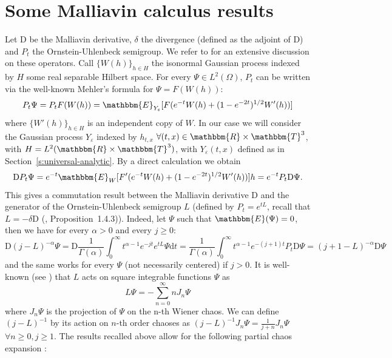 \documentclass[a4paper,11pt]{article}
\newcommand{\mathD}{\mathrm{D}}
\newcommand{\mathd}{\mathrm{d}}
\begin{document}
\section{Some Malliavin calculus results}\label{a:malliavin}

Let $\mathD$ be the Malliavin derivative, $\delta$ the divergence (defined as
the adjoint of $\mathD$) and $P_t$ the Ornstein-Uhlenbeck semigroup. We refer
to {\cite{nualart_2006}} for an extensive discussion on these operators. Call
$\{ W (h) \}_{h \in H}$ the isonormal Gaussian process indexed by $H$ some
real separable Hilbert space. For every $\Psi \in L^2 (\Omega)$, $P_t$ can be
written via the well-known Mehler's formula for $\Psi = F (W (h))$:
\begin{equation}
  P_t \Psi = P_t F (W (h)) =\mathbbm{E}_{Y_{\varepsilon}} [F (e^{- t} W (h) +
  (1 - e^{- 2 t})^{1 / 2} W' (h))]  \label{e:mehler}
\end{equation}
where $\{ W' (h) \}_{h \in H}$ is an independent copy of $W$. In our case we
will consider the Gaussian process $Y_{\varepsilon}$ indexed by $h_{t, x}$
$\forall (t, x) \in \mathbbm{R} \times \mathbbm{T}^3$, with $H = L^2
(\mathbbm{R} \times \mathbbm{T}^3)$, with $Y_{\varepsilon} (t, x)$ defined as
in Section~\ref{s:universal-analytic}. By a direct calculation we obtain
\begin{equation}
  \mathD P_t \Psi = e^{- t} \mathbbm{E}_W [F' (e^{- t} W (h) + (1 - e^{- 2
  t})^{1 / 2} W' (h))] h = e^{- t} P_t \mathD \Psi .
\end{equation}
This gives a commutation result between the Malliavin derivative $\mathD$ and
the generator of the Ornstein-Uhlenbeck semigroup $L$ (defined by $P_t =
e^{tL}$, recall that $L = - \delta \mathD$ ({\cite{nualart_2006}},
Proposition~1.4.3)). Indeed, let $\Psi$ such that $\mathbbm{E} (\Psi) = 0$,
then we have for every $\alpha > 0$ and every $j \geqslant 0$:
\begin{equation}
  \mathD (j - L)^{- \alpha} \Psi = \mathD \frac{1}{\Gamma (\alpha)}
  \int_0^{\infty} t^{\alpha - 1} e^{- j t} e^{tL} \Psi \mathd t =
  \frac{1}{\Gamma (\alpha)} \int_0^{\infty} t^{\alpha - 1} e^{- (j + 1) t} P_t
  \mathD \Psi = (j + 1 - L)^{- \alpha} \mathD \Psi \label{e:LDcomm}
\end{equation}
and the same works for every $\Psi$ (not necessarily centered) if $j > 0$. It
is well-known (see {\cite{nualart_2006}}) that $L$ acts on square integrable
functions $\Psi$ as
\[ L \Psi = - \sum_{n = 0}^{\infty} nJ_n \Psi \]
where $J_n \Psi$ is the projection of $\Psi$ on the n-th Wiener chaos. We can
define $(j - L)^{- 1}$ by its action on $n$-th order chaoses as $(j - L)^{- 1}
J_n \Psi = \frac{1}{j + n} J_n \Psi$ $\forall n \geqslant 0, j \geqslant 1$.
The results recalled above allow for the following partial chaos expansion :
\end{document}
